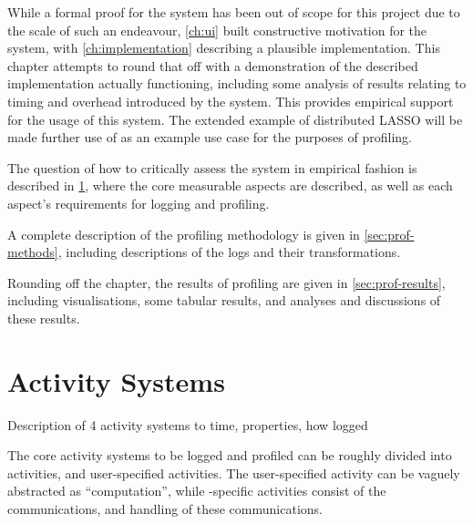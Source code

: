 \bigskip
\newline
While a formal proof for the \lsr system has been out of scope for this project due to the scale of such an endeavour, \cref{ch:ui} built constructive motivation for the system, with \cref{ch:implementation} describing a plausible implementation.
This chapter attempts to round that off with a demonstration of the described implementation actually functioning, including some analysis of results relating to timing and overhead introduced by the system.
This provides empirical support for the usage of this system.
The extended example of distributed LASSO will be made further use of as an example use case for the purposes of profiling.

The question of how to critically assess the system in empirical fashion is described in \cref{sec:activity-systems}, where the core measurable aspects are described, as well as each aspect's requirements for logging and profiling.

A complete description of the profiling methodology is given in \cref{sec:prof-methods}, including descriptions of the logs and their transformations.

Rounding off the chapter, the results of profiling are given in \cref{sec:prof-results}, including visualisations, some tabular results, and analyses and discussions of these results.

\section{Activity Systems}\label{sec:activity-systems}
Description of 4 activity systems to time, properties, how logged

The core activity systems to be logged and profiled can be roughly divided into \lsr activities, and user-specified activities.
The user-specified activity can be vaguely abstracted as ``computation'', while \lsr{}-specific activities consist of the communications, and handling of these communications.

